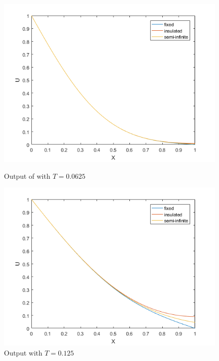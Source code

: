 \documentclass[10pt,a4paper]{report}
\begin{document}
\newpage

\begin{figure}[ht]
\begin{minipage}[b]{0.5\linewidth}
\centering
\includegraphics[width=\textwidth]{anal00625}
\caption{Output of with $T=0.0625$}
\end{minipage}
\hspace{0.5cm}
\begin{minipage}[b]{0.5\linewidth}
\centering
\includegraphics[width=\textwidth]{anal0125}
\caption{Output with $T=0.125$}
\end{minipage}
\end{figure}
\end{document}

